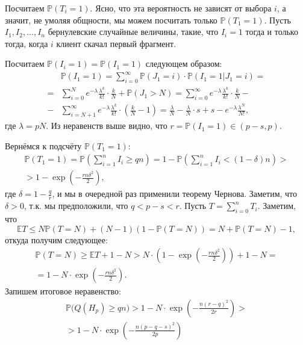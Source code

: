 \documentclass{matmex-diploma-custom}
\newcommand{\Expect}{\mathbb E}
\newcommand{\PRob}{\mathbb P}
\newcommand{\leqs}{\leqslant}
\newcommand{\geqs}{\geqslant}
\theoremstyle{named}
\begin{document}
Посчитаем $\PRob(T_i = 1)$. Ясно, что эта вероятность не зависят от выбора $i$, а значит, 
не умоляя общности, мы можем посчитать только $\PRob(T_1 = 1)$.
Пусть $I_1, I_2, \dots, I_n$ бернулевские случайные величины, такие, что $I_i = 1$ тогда и только тогда, 
когда $i$ клиент скачал первый фрагмент. 

Посчитаем $\PRob(I_i = 1) = \PRob(I_1 = 1)$ следующем образом:
\begin{equation}\begin{aligned}
&\PRob(I_1 = 1) = \sum_{i = 0}^\infty \PRob(J_1 = i) \cdot \PRob(I_1 = 1 | J_1 = i) 
	= 
\\
	= 
&\sum_{i = 0}^N e^{-\lambda} \frac{\lambda^k}{k!} \cdot \frac {k}{N} + \PRob(J_1 > N)
	=
\sum_{i = 0}^{\infty} e^{-\lambda} \frac{\lambda^k}{k!} \cdot \frac {k}{N}  
	- 
	\\
	-
&\sum_{i = N + 1}^{\infty} e^{-\lambda} \frac{\lambda^k}{k!} \cdot \left(\frac {k}{N} - 1\right)
	=
\frac{\lambda}{N} - \frac{\lambda}{N} \cdot s + s - e^{-\lambda} \frac{\lambda^N}{N!},
\end{aligned}\end{equation}
где $\lambda = pN$. Из неравенств выше видно, что $r = \PRob(I_1 = 1) \in (p - s, p)$.

Вернёмся к подсчёту $\PRob(T_1 = 1)$:
\begin{equation}\begin{aligned}
\PRob(T_1 = 1) = \PRob\left(\sum_{i=1}^n I_i \geqs qn\right) 
	= 
1 - \PRob\left(\sum_{i=1}^n I_i < (1-\delta)n\right)
	>
\\
	>
1 - \exp \left( - \frac{rn \delta^2}{2} \right),
\end{aligned}\end{equation}
где $\delta = 1 - \frac{q}{r}$, и мы в очередной раз применили теорему Чернова. 
Заметим, что $\delta > 0$, т.к. мы предположили, что $q < p-s < r$.
Пусть $T = \sum\limits_{i = 0}^n T_i$. Заметим, что 
\begin{equation}
\Expect T \leqs N \PRob(T = N) + (N-1) (1 - \PRob(T = N)) = N + \PRob(T = N) - 1,
\end{equation}
откуда получим следующее:
\begin{equation}\begin{aligned}
\PRob(T = N) \geqs \Expect T + 1 - N > N \cdot \left(1 - \exp \left( - \frac{rn \delta^2}{2} \right)\right)  + 1 - N
=
	\\
=
1 - N \cdot \exp \left( - \frac{rn \delta^2}{2} \right).
\end{aligned}\end{equation}
Запишем итоговое неравенство:
\begin{equation}\label{t3_1} \begin{aligned}
\PRob\big(Q(H_p) \geqs qn \big) 
	> 
1 - N \cdot \exp\left(- \frac{n (r-q)^2}{2r} \right)
	>
\\ 
	>  
1 - N \cdot \exp\left(- \frac{n (p - q - s)^2}{2p} \right) 
\end{aligned}\end{equation}
\end{document}
